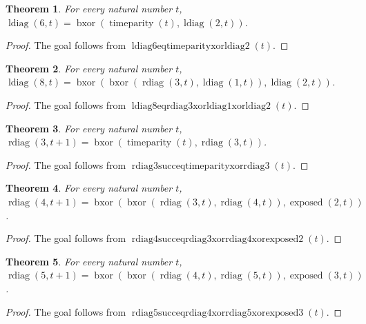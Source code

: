\documentclass[11pt]{article}
\newtheorem{theorem}{Theorem}[section]
\theoremstyle{definition}
\begin{document}
\begin{theorem}
\label{ll:observations:ldiag6-eq-time-parity-xor-ldiag2}
For every natural number \(t\), \(\operatorname{ldiag}(6, t) = \operatorname{bxor}(\operatorname{timeparity}(t), \operatorname{ldiag}(2, t))\).
\end{theorem}
\begin{proof}
The goal follows from \(\operatorname{ldiag6eqtimeparityxorldiag2}(t)\).
\end{proof}
\begin{theorem}
\label{ll:observations:ldiag8-eq-rdiag3-xor-ldiag1-xor-ldiag2}
For every natural number \(t\), \(\operatorname{ldiag}(8, t) = \operatorname{bxor}(\operatorname{bxor}(\operatorname{rdiag}(3, t), \operatorname{ldiag}(1, t)), \operatorname{ldiag}(2, t))\).
\end{theorem}
\begin{proof}
The goal follows from \(\operatorname{ldiag8eqrdiag3xorldiag1xorldiag2}(t)\).
\end{proof}
\begin{theorem}
\label{ll:observations:rdiag3-succ-eq-time-parity-xor-rdiag3}
For every natural number \(t\), \(\operatorname{rdiag}(3, t + 1) = \operatorname{bxor}(\operatorname{timeparity}(t), \operatorname{rdiag}(3, t))\).
\end{theorem}
\begin{proof}
The goal follows from \(\operatorname{rdiag3succeqtimeparityxorrdiag3}(t)\).
\end{proof}
\begin{theorem}
\label{ll:observations:rdiag4-succ-eq-rdiag3-xor-rdiag4-xor-exposed2}
For every natural number \(t\), \(\operatorname{rdiag}(4, t + 1) = \operatorname{bxor}(\operatorname{bxor}(\operatorname{rdiag}(3, t), \operatorname{rdiag}(4, t)), \operatorname{exposed}(2, t))\).
\end{theorem}
\begin{proof}
The goal follows from \(\operatorname{rdiag4succeqrdiag3xorrdiag4xorexposed2}(t)\).
\end{proof}
\begin{theorem}
\label{ll:observations:rdiag5-succ-eq-rdiag4-xor-rdiag5-xor-exposed3}
For every natural number \(t\), \(\operatorname{rdiag}(5, t + 1) = \operatorname{bxor}(\operatorname{bxor}(\operatorname{rdiag}(4, t), \operatorname{rdiag}(5, t)), \operatorname{exposed}(3, t))\).
\end{theorem}
\begin{proof}
The goal follows from \(\operatorname{rdiag5succeqrdiag4xorrdiag5xorexposed3}(t)\).
\end{proof}
\end{document}
